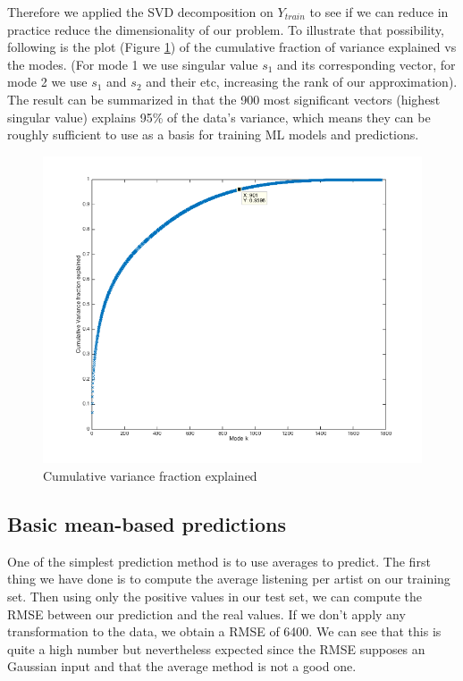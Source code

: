 \documentclass{article} %
\begin{document}
Therefore we applied the SVD decomposition on $Y_{train}$ to see if we can reduce in practice reduce the dimensionality of our problem. To illustrate that possibility, following is the plot (Figure \ref{fig:modk}) of the cumulative fraction of variance explained vs the modes. (For mode 1 we use singular value $s_1$ and its corresponding vector, for mode 2 we use $s_1$ and $s_2$ and their etc, increasing the rank of our approximation). The result can be summarized in that the 900 most significant vectors (highest singular value) explains 95\% of the data’s variance, which means they can be roughly sufficient to use as a basis for training ML models and predictions.
\begin{figure}
\centering
\includegraphics[width=1\textwidth]{images/svdvariancemodes.png}
\caption{Cumulative variance fraction explained}
\label{fig:modk}
\end{figure}

\subsection{Basic mean-based predictions}
One of the simplest prediction method is to use averages to predict. The first thing we have done is to compute the average listening per artist on our training set.  Then using only the positive values in our test set, we can compute the RMSE between our prediction and the real values. If we don’t apply any transformation to the data, we obtain a RMSE of 6400. We can see that this is quite a high number but nevertheless expected since the RMSE supposes an Gaussian input and that the average method is not a good one. 
\end{document}
